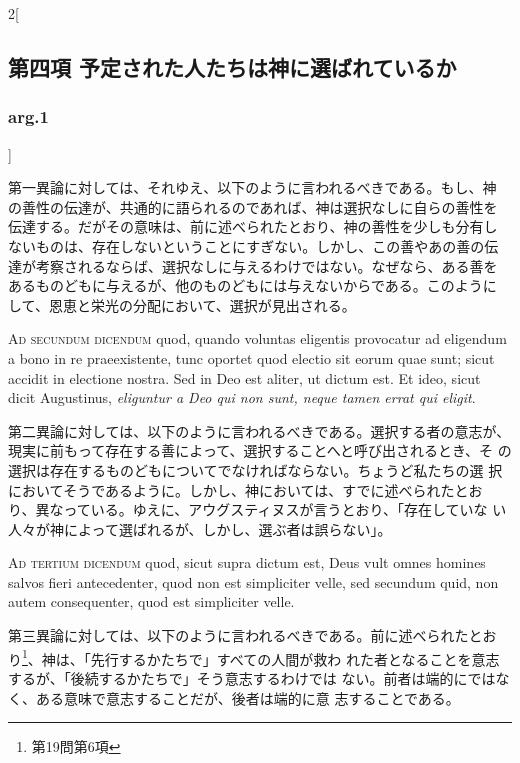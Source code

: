 \documentclass[paper=a4paper,fontsize=10pt,jafontsize=9pt,titlepage]{jlreq}
\begin{document}
\begin{paracol}{2}[\subsection{第四項 予定された人たちは神に選ばれているか}\subsubsection{arg.1}]
\switchcolumn


第一異論に対しては、それゆえ、以下のように言われるべきである。もし、神
の善性の伝達が、共通的に語られるのであれば、神は選択なしに自らの善性を
伝達する。だがその意味は、前に述べられたとおり、神の善性を少しも分有し
ないものは、存在しないということにすぎない。しかし、この善やあの善の伝
達が考察されるならば、選択なしに与えるわけではない。なぜなら、ある善を
あるものどもに与えるが、他のものどもには与えないからである。このように
して、恩恵と栄光の分配において、選択が見出される。


\switchcolumn*[\subsubsection{ad.2}]


{\scshape Ad secundum dicendum} quod, quando voluntas
 eligentis provocatur ad eligendum a bono in re praeexistente, tunc
 oportet quod electio sit eorum quae sunt; sicut accidit in electione
 nostra. Sed in Deo est aliter, ut dictum est. Et ideo, sicut dicit
 Augustinus, {\itshape eliguntur a Deo qui non sunt, neque tamen errat qui eligit}.


\switchcolumn


第二異論に対しては、以下のように言われるべきである。選択する者の意志が、
現実に前もって存在する善によって、選択することへと呼び出されるとき、そ
の選択は存在するものどもについてでなければならない。ちょうど私たちの選
択においてそうであるように。しかし、神においては、すでに述べられたとお
り、異なっている。ゆえに、アウグスティヌスが言うとおり、「存在していな
い人々が神によって選ばれるが、しかし、選ぶ者は誤らない」。


\switchcolumn*[\subsubsection{ad.3}]


{\scshape Ad tertium dicendum} quod, sicut supra dictum
 est, Deus vult omnes homines salvos fieri antecedenter, quod non est
 simpliciter velle, sed secundum quid, non autem consequenter, quod est
 simpliciter velle.


\switchcolumn


第三異論に対しては、以下のように言われるべきである。前に述べられたとお
り\footnote{第19問第6項}、神は、「先行するかたちで」すべての人間が救わ
れた者となることを意志するが、「後続するかたちで」そう意志するわけでは
ない。前者は端的にではなく、ある意味で意志することだが、後者は端的に意
志することである。


\switchcolumn*



\end{paracol}
\newpage
\end{document}

